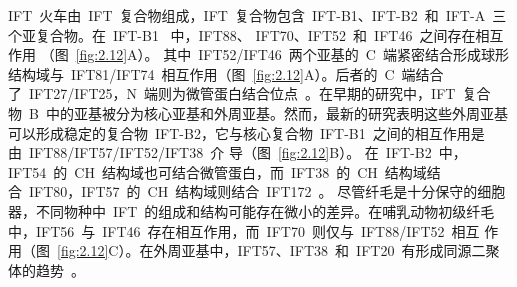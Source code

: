IFT\ 火车由\ IFT\ 复合物组成，IFT\ 复合物包含\ IFT-B1、IFT-B2\ 和\ IFT-A\ 三个亚复合物。在\ IFT-B1 \ 中，IFT88、 IFT70、IFT52\ 和\ IFT46\ 之间存在相互作用
（图\ \ref{fig:2.12}A）\citep{Taschner2014}。 其中\ IFT52/IFT46\ 两个亚基的\ C\ 端紧密结合形成球形结构域与\ IFT81/IFT74\ 相互作用（图\ \ref{fig:2.12}A）\citep{Taschner2014}。后者的\ C\ 端结合了\ IFT27/IFT25，N\ 端则为微管蛋白结合位点\ \citep{Bhogaraju2013a,Bhogaraju2014,Kubo2016}。在早期的研究中，IFT\ 复合物\ B\ 中的亚基被分为核心亚基和外周亚基。然而，最新的研究表明这些外周亚基可以形成稳定的复合物\ IFT-B2，它与核心复合物\ IFT-B1\ 之间的相互作用是由\ IFT88/IFT57/IFT52/IFT38\ 介
导（图\ \ref{fig:2.12}B）\citep{Taschner2016a}。 在\ IFT-B2\ 中，IFT54\ 的\ CH\ 结构域也可结合微管蛋白，而\ IFT38\ 的\ CH\ 结构域结合\ IFT80，IFT57\ 的\ CH\ 结构域则结合\ IFT172\ \citep{Taschner2016a}。 尽管纤毛是十分保守的细胞器，不同物种中\ IFT\ 的组成和结构可能存在微小的差异。在哺乳动物初级纤毛中，IFT56\ 与\ IFT46\ 存在相互作用，而\ IFT70\ 则仅与\ IFT88/IFT52\ 相互
作用（图\ \ref{fig:2.12}C）\citep{Katoh2016}。在外周亚基中，IFT57、IFT38\ 和\ IFT20\ 有形成同源二聚体的趋势\ \citep{Katoh2016}。
